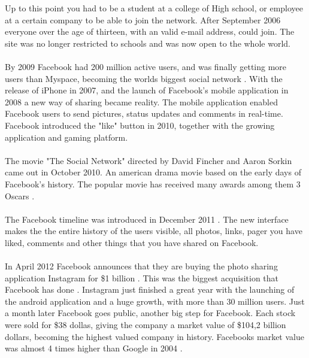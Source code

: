 Up to this point you had to be a student at a college of High school, or employee at a certain company to be able to join the network. After September 2006 everyone over the age of thirteen, with an valid e-mail address, could join. The site was no longer restricted to schools and was now open to the whole world. 

\paragraph{}
By 2009 Facebook had 200 million active users, and was finally getting more users than Myspace, becoming the worlds biggest social network \cite{FacebookStoryInceptionToIsp}. With the release of iPhone in 2007, and the launch of Facebook's mobile application in 2008 a new way of sharing became reality. The mobile application enabled Facebook users to send pictures, status updates and comments in real-time. Facebook introduced the "like" button in 2010, together with the growing application and gaming platform. 


\paragraph{}
The movie "The Social Network" directed by David Fincher and Aaron Sorkin came out in October 2010. An american drama movie based on the early days of Facebook's history. The popular movie has received many awards among them 3 Oscars \cite{TheSocialNetwork}. 

\paragraph{}
The Facebook timeline was introduced in December 2011 \cite{EvolutionOfFacebook}. The new interface makes the the entire history of the users visible, all photos, links, pager you have liked, comments and other things that you have shared on Facebook. 

\paragraph{}
In April 2012 Facebook announces that they are buying the photo sharing application Instagram for \$1 billion . This was the biggest acquisition that Facebook has done \cite{FacebookInstragram}. Instagram just finished a great year with the launching of the android application and a huge growth, with more than 30 million users. 
Just a month later Facebook goes public, another big step for Facebook. Each stock were sold for \$38 dollas, giving the company a market value of \$104,2 billion dollars, becoming the highest valued company in history. Facebooks market value was almost 4 times higher than Google in 2004 \cite{EvolutionOfFacebook}. 
  
